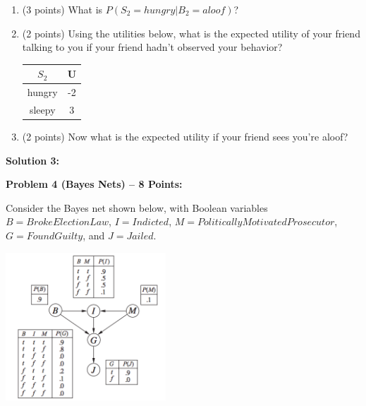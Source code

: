 \documentclass[]{article}
\begin{document}
\begin{enumerate}[label=(\alph*)]
    \item (3 points) What is $P(S_2 = hungry | B_2 = aloof)$?
    \item (2 points) Using the utilities below, what is the expected utility of your friend talking to you if your friend hadn't observed your behavior?
    
    \begin{table}[!htb]
    \centering
        \begin{tabular}{|c|c|}
            \hline
             $S_2$ & U \\\hline
             hungry & -2 \\\hline
             sleepy & 3 \\\hline
        \end{tabular}
    \end{table}
    
    \item (2 points) Now what is the expected utility if your friend sees you're aloof?
\end{enumerate}

\bigskip

\textbf{Solution 3:}

\clearpage

\textbf{Problem 4 (Bayes Nets) -- 8 Points:}

Consider the Bayes net shown below, with Boolean variables $B = BrokeElectionLaw$, $I = Indicted$, $M = PoliticallyMotivatedProsecutor$, $G = FoundGuilty$, and $J = Jailed$.

\begin{center}
    \includegraphics[width=6cm]{BN2.png}
\end{center}
\end{document}
